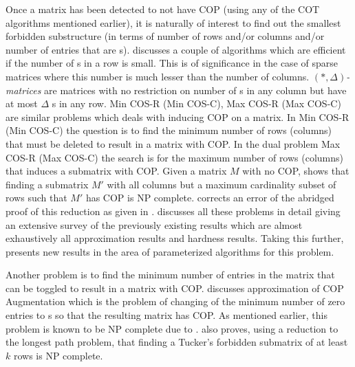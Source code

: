 Once a matrix has been detected to not have COP (using any of the COT
algorithms mentioned earlier), it is naturally of interest to find out
the smallest forbidden substructure (in terms of number of rows and/or
columns and/or number of entries that are {\un}s). \cite{d08phd}
discusses a couple of algorithms which are efficient if the number of
{\un}s in a row is small. This is of significance in the case of
sparse matrices where this number is much lesser than the number of
columns. $(*,\Delta)${\em -matrices} are matrices with no restriction
on number of {\un}s in any column but have at most $\Delta$ {\un}s in
any row. {\sc Min COS-R (Min COS-C), Max COS-R (Max COS-C)} are
similar problems which deals with inducing COP on a matrix. In {\sc
  Min COS-R (Min COS-C)} the question is to find the minimum number of
rows (columns) that must be deleted to result in a matrix with COP.
In the dual problem {\sc Max COS-R (Max COS-C)} the search is for the
maximum number of rows (columns) that induces a submatrix with
COP. Given a matrix $M$ with no COP, \cite{b75-phd} shows that finding
a submatrix $M'$ with all columns but a maximum cardinality
subset of rows such that $M'$ has COP is NP complete. \cite{hg02}
corrects an error of the abridged proof of this reduction as given in
\cite{gj79}.  \cite{d08phd} discusses all these problems in detail
giving an extensive survey of the previously existing results which
are almost exhaustively all approximation results and hardness
results. Taking this further, \cite{d08phd} presents new results in
the area of parameterized algorithms for this
problem.

Another problem is to find the minimum number of entries in the matrix
that can be toggled to result in a matrix with COP.  \cite{v85}
discusses approximation of {\sc COP Augmentation} which is the problem
of changing of the minimum number of zero entries to {\un}s so that
the resulting matrix has COP. As mentioned earlier, this problem is
known to be NP complete due to \cite{b75-phd}. \cite{v85} also proves,
using a reduction to the longest path problem,  that finding a Tucker's forbidden
submatrix of at least $k$ rows is NP complete.   

